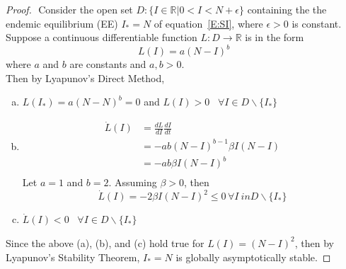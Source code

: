 \begin{proof} $ $\newline
    Consider the open set $D: \{I \in \mathbb{R}| 0 < I < N+ \epsilon \}$ containing the the endemic equilibrium (EE) $I_* = N$ of equation~\eqref{E:SI}, where $\epsilon > 0$ is constant.
    Suppose a continuous differentiable function $L:D\rightarrow \mathbb{R}$  is in the form
    \begin{equation}
        L(I) = a(N-I)^b
    \end{equation}
    where $a$ and $b$ are constants and $a, b > 0$.\\
    Then by Lyapunov's Direct Method,
    \begin{enumerate}[(a)]
        \item $L(I_*) = a(N-N)^b = 0$ and $L(I)>0$ \, $\forall I\in D\backslash \{I_*\}$
        \item
        \begin{align*}
            \dot{L}(I)  &= \frac{dL}{dI} \frac{dI}{dt} \\
            &= -ab(N-I)^{b-1}\beta I(N-I)\\
            &= -ab\beta I(N-I)^b\\
        \end{align*}
        Let $a = 1$ and $b = 2$. Assuming $\beta>0$, then
        $$\dot{L}(I) = -2\beta I(N-I)^2 \leq 0 \, \forall I\ in D \backslash \{I_*\}$$
        \item $\dot{L}(I) < 0$ \, $\forall I\in D\backslash \{I_*\}$
    \end{enumerate}
    Since the above (a), (b), and (c) hold true for $L(I) = (N-I)^2$, then by Lyapunov's Stability Theorem, $I_* = N$ is globally asymptotically stable.
\end{proof}
